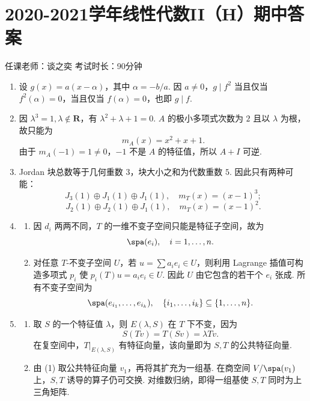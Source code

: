 \section{2020-2021学年线性代数II（H）期中答案}

\begin{center}
    任课老师：谈之奕\hspace{4em} 考试时长：90分钟
\end{center}
\begin{enumerate}
    \item 设 $g(x)=a(x-\alpha)$，其中 $\alpha=-b/a$. 因 $a\neq 0$，$g\mid f^2$ 当且仅当 $f^2(\alpha)=0$，当且仅当 $f(\alpha)=0$，也即 $g\mid f$.

    \item 因 $\lambda^3=1,\lambda\notin\mathbf{R}$，有 $\lambda^2+\lambda+1=0$. $A$ 的极小多项式次数为 $2$ 且以 $\lambda$ 为根，故只能为
    \[
        m_A(x)=x^2+x+1.
    \]
    由于 $m_A(-1)=1\neq 0$，$-1$ 不是 $A$ 的特征值，所以 $A+I$ 可逆.

    \item Jordan 块总数等于几何重数 $3$，块大小之和为代数重数 $5$. 因此只有两种可能：
    \[
        J_3(1)\oplus J_1(1)\oplus J_1(1),\quad m_T(x)=(x-1)^3;
    \]
    \[
        J_2(1)\oplus J_2(1)\oplus J_1(1),\quad m_T(x)=(x-1)^2.
    \]

    \item
    \begin{enumerate}
        \item 因 $d_i$ 两两不同，$T$ 的一维不变子空间只能是特征子空间，故为
        \[
            \spa(e_i),\quad i=1,\ldots,n.
        \]

        \item 对任意 $T$-不变子空间 $U$，若 $u=\sum a_i e_i\in U$，则利用 Lagrange 插值可构造多项式 $p_i$ 使 $p_i(T)u=a_i e_i\in U$. 因此 $U$ 由它包含的若干个 $e_i$ 张成. 所有不变子空间为
        \[
            \spa(e_{i_1},\ldots,e_{i_k}),\quad \{i_1,\ldots,i_k\}\subseteq\{1,\ldots,n\}.
        \]
    \end{enumerate}

    \item
    \begin{enumerate}
        \item 取 $S$ 的一个特征值 $\lambda$，则 $E(\lambda,S)$ 在 $T$ 下不变，因为
        \[
            S(Tv)=T(Sv)=\lambda Tv.
        \]
        在复空间中，$T|_{E(\lambda,S)}$ 有特征向量，该向量即为 $S,T$ 的公共特征向量.

        \item 由 (1) 取公共特征向量 $v_1$，再将其扩充为一组基. 在商空间 $V/\spa(v_1)$ 上，$S,T$ 诱导的算子仍可交换. 对维数归纳，即得一组基使 $S,T$ 同时为上三角矩阵.
    \end{enumerate}


\end{enumerate}
